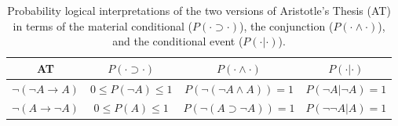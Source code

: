 \documentclass[11pt]{article}
\begin{document}
\begin{table}
\begin{center}
\begin{tabular}{cccc}\hline\hline
     AT                           & $P(\cdot \supset \cdot)$ & $P(\cdot \wedge \cdot)$ & $P(\cdot | \cdot)$\\\hline
 $\neg (\neg A\rightarrow   A)$ &$0\leq P(\neg A)\leq 1$ &
$P(\neg ( \neg A \wedge A))=1$ & $P(\neg A| \neg A )=1$\\
$\neg (A\rightarrow \neg A)$ &$0\leq P(A)\leq 1$ & $P(\neg (A  \supset \neg
A ))=1$ & $ P(\neg \neg A|A)=1$\\ \hline\hline
\end{tabular}
\end{center}
\caption{\label{AT} Probability logical interpretations of the two
  versions of Aristotle's Thesis (AT) in terms of the material
  conditional ($P(\cdot \supset \cdot)$), the conjunction
  ($P(\cdot \wedge \cdot)$), and the conditional event ($P(\cdot | \cdot)$).}
\end{table}

~

 \newpage

~
\end{document}
